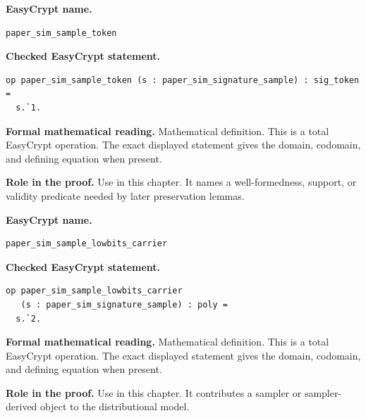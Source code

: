 \begin{formaldefinition}
\noindent\textbf{EasyCrypt name.}
\begin{lstlisting}[language=EasyCrypt,basicstyle=\ttfamily\scriptsize]
paper_sim_sample_token
\end{lstlisting}
\noindent\textbf{Checked EasyCrypt statement.}
\begin{lstlisting}[language=EasyCrypt,basicstyle=\ttfamily\scriptsize]
op paper_sim_sample_token (s : paper_sim_signature_sample) : sig_token =
  s.`1.
\end{lstlisting}
\noindent\textbf{Formal mathematical reading.}
Mathematical definition. This is a total EasyCrypt operation.  The exact displayed statement gives the domain, codomain, and defining equation when present.

\noindent\textbf{Role in the proof.}
Use in this chapter. It names a well-formedness, support, or validity predicate needed by later preservation lemmas.

\end{formaldefinition}

\begin{formaldefinition}
\noindent\textbf{EasyCrypt name.}
\begin{lstlisting}[language=EasyCrypt,basicstyle=\ttfamily\scriptsize]
paper_sim_sample_lowbits_carrier
\end{lstlisting}
\noindent\textbf{Checked EasyCrypt statement.}
\begin{lstlisting}[language=EasyCrypt,basicstyle=\ttfamily\scriptsize]
op paper_sim_sample_lowbits_carrier
   (s : paper_sim_signature_sample) : poly =
  s.`2.
\end{lstlisting}
\noindent\textbf{Formal mathematical reading.}
Mathematical definition. This is a total EasyCrypt operation.  The exact displayed statement gives the domain, codomain, and defining equation when present.

\noindent\textbf{Role in the proof.}
Use in this chapter. It contributes a sampler or sampler-derived object to the distributional model.

\end{formaldefinition}

